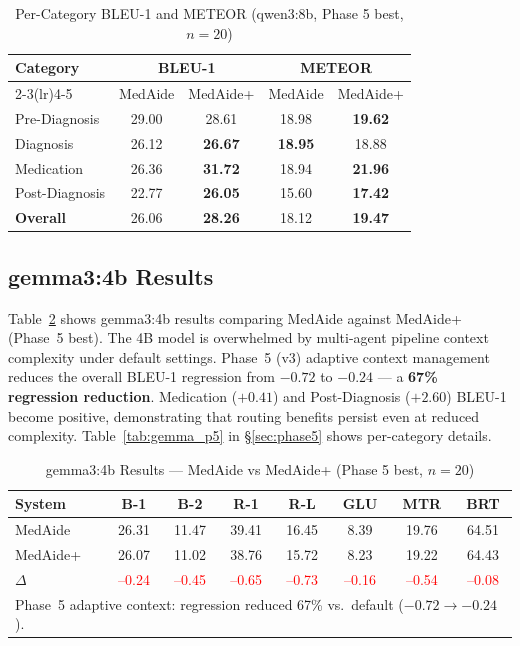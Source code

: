 \documentclass[conference]{IEEEtran}
\begin{document}
\begin{table}[t]
\centering
\caption{Per-Category BLEU-1 and METEOR (qwen3:8b, Phase 5 best, $n{=}20$)}
\label{tab:percategory}
\begin{tabular}{lcccc}
\toprule
\multirow{2}{*}{\textbf{Category}} & \multicolumn{2}{c}{\textbf{BLEU-1}} & \multicolumn{2}{c}{\textbf{METEOR}} \\
\cmidrule(lr){2-3}\cmidrule(lr){4-5}
& MedAide & MedAide+ & MedAide & MedAide+ \\
\midrule
Pre-Diagnosis  & 29.00 & 28.61 & 18.98 & \textbf{19.62} \\
Diagnosis      & 26.12 & \textbf{26.67} & \textbf{18.95} & 18.88 \\
Medication     & 26.36 & \textbf{31.72} & 18.94 & \textbf{21.96} \\
Post-Diagnosis & 22.77 & \textbf{26.05} & 15.60 & \textbf{17.42} \\
\midrule
\textbf{Overall} & 26.06 & \textbf{28.26} & 18.12 & \textbf{19.47} \\
\bottomrule
\end{tabular}
\end{table}

\subsection{gemma3:4b Results}

Table~\ref{tab:gemma} shows gemma3:4b results comparing MedAide against MedAide+ (Phase~5 best). The 4B model is overwhelmed by multi-agent pipeline context complexity under default settings. Phase~5 (v3) adaptive context management reduces the overall BLEU-1 regression from $-0.72$ to $-0.24$ — a \textbf{67\% regression reduction}. Medication ($+0.41$) and Post-Diagnosis ($+2.60$) BLEU-1 become positive, demonstrating that routing benefits persist even at reduced complexity. Table~\ref{tab:gemma_p5} in \S\ref{sec:phase5} shows per-category details.

\begin{table}[t]
\centering
\caption{gemma3:4b Results — MedAide vs MedAide+ (Phase 5 best, $n{=}20$)}
\label{tab:gemma}
\setlength{\tabcolsep}{4pt}
\begin{tabular}{lccccccc}
\toprule
\textbf{System} & \textbf{B-1} & \textbf{B-2} & \textbf{R-1} & \textbf{R-L} & \textbf{GLU} & \textbf{MTR} & \textbf{BRT} \\
\midrule
MedAide  & 26.31 & 11.47 & 39.41 & 16.45 & 8.39 & 19.76 & 64.51 \\
MedAide+ & 26.07 & 11.02 & 38.76 & 15.72 & 8.23 & 19.22 & 64.43 \\
$\Delta$ & \textcolor{red}{--0.24} & \textcolor{red}{--0.45} & \textcolor{red}{--0.65} & \textcolor{red}{--0.73} & \textcolor{red}{--0.16} & \textcolor{red}{--0.54} & \textcolor{red}{--0.08} \\
\midrule
\multicolumn{8}{l}{\scriptsize Phase~5 adaptive context: regression reduced 67\% vs.\ default ($-0.72 \rightarrow -0.24$).} \\
\bottomrule
\end{tabular}
\end{table}
\end{document}

